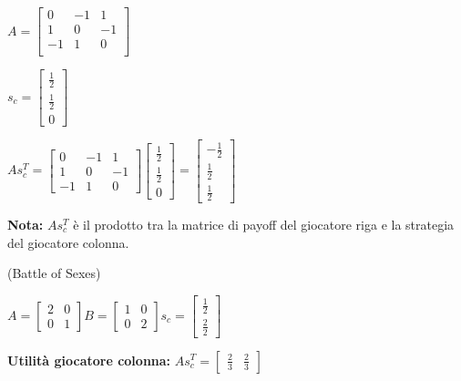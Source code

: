 $A = \begin{bmatrix}
        0  & -1 & 1  \\
        1  & 0  & -1 \\
        -1 & 1  & 0  \\
    \end{bmatrix}$


$s_c = \begin{bmatrix}
        \frac{1}{2} \\
        \frac{1}{2} \\
        0
    \end{bmatrix}$

$As_c^T = \begin{bmatrix}
        0  & -1 & 1  \\
        1  & 0  & -1 \\
        -1 & 1  & 0
    \end{bmatrix} \begin{bmatrix}
        \frac{1}{2} \\
        \frac{1}{2} \\
        0
    \end{bmatrix} = \begin{bmatrix}
        -\frac{1}{2} \\
        \frac{1}{2}  \\
        \frac{1}{2}
    \end{bmatrix}$

\textbf{Nota:} $As_c^T$ è il prodotto tra la matrice di payoff del giocatore riga e la strategia del giocatore colonna.


\begin{esempio}(Battle of Sexes)
\end{esempio}

$A = \begin{bmatrix}
    2 & 0 \\
    0 & 1 
\end{bmatrix} B = \begin{bmatrix}
    1 & 0 \\
    0 & 2 
\end{bmatrix} s_c = \begin{bmatrix}
    \frac{1}{2} \\
    \frac{2}{2} 
\end{bmatrix}
$

\textbf{Utilità giocatore colonna:} 
$
As_c^T = \begin{bmatrix}
    \frac{2}{3} & \frac{2}{3} 
\end{bmatrix}
$

